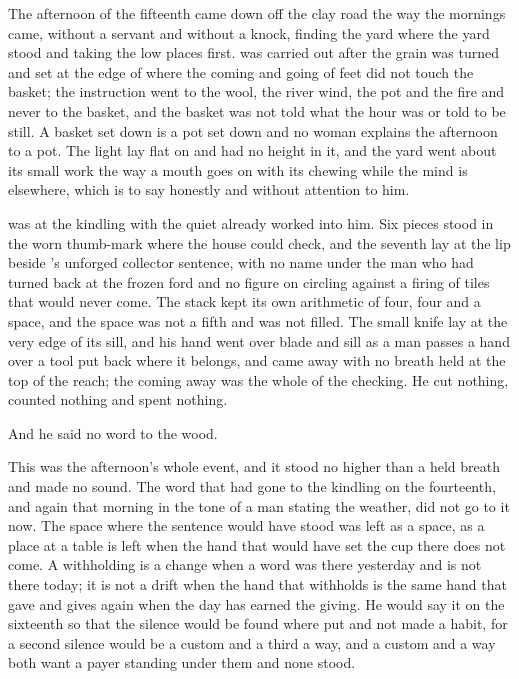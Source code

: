 The afternoon of the fifteenth came down off the clay road the way the mornings came, without a servant and without a knock, finding the yard where the yard stood and taking the low places first.  was carried out after the grain was turned and set at the edge of  where the coming and going of feet did not touch the basket; the instruction went to the wool, the river wind, the pot and the fire and never to the basket, and the basket was not told what the hour was or told to be still. A basket set down is a pot set down and no woman explains the afternoon to a pot. The light lay flat on  and had no height in it, and the yard went about its small work the way a mouth goes on with its chewing while the mind is elsewhere, which is to say honestly and without attention to him.

 was at the kindling with the quiet already worked into him. Six pieces stood in the worn thumb-mark where the house could check, and the seventh lay at the lip beside 's unforged collector sentence, with no name under the man who had turned back at the frozen ford and no figure on  circling against a firing of tiles that would never come. The stack kept its own arithmetic of four, four and a space, and the space was not a fifth and was not filled. The small knife lay at the very edge of its sill, and his hand went over blade and sill as a man passes a hand over a tool put back where it belongs, and came away with no breath held at the top of the reach; the coming away was the whole of the checking. He cut nothing, counted nothing and spent nothing.

And he said no word to the wood.

This was the afternoon's whole event, and it stood no higher than a held breath and made no sound. The word that had gone to the kindling on the fourteenth, and again that morning in the tone of a man stating the weather, did not go to it now. The space where the sentence would have stood was left as a space, as a place at a table is left when the hand that would have set the cup there does not come. A withholding is a change when a word was there yesterday and is not there today; it is not a drift when the hand that withholds is the same hand that gave and gives again when the day has earned the giving. He would say it on the sixteenth so that the silence would be found where put and not made a habit, for a second silence would be a custom and a third a way, and a custom and a way both want a payer standing under them and none stood.

